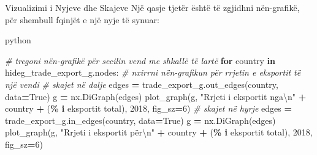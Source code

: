 \documentclass[
  ignorenonframetext,
]{beamer}
\newenvironment{Shaded}{\begin{snugshade}}{\end{snugshade}}
\newcommand{\CharTok}[1]{\textcolor[rgb]{0.31,0.60,0.02}{#1}}
\newcommand{\CommentTok}[1]{\textcolor[rgb]{0.56,0.35,0.01}{\textit{#1}}}
\newcommand{\ControlFlowTok}[1]{\textcolor[rgb]{0.13,0.29,0.53}{\textbf{#1}}}
\newcommand{\DecValTok}[1]{\textcolor[rgb]{0.00,0.00,0.81}{#1}}
\newcommand{\KeywordTok}[1]{\textcolor[rgb]{0.13,0.29,0.53}{\textbf{#1}}}
\newcommand{\NormalTok}[1]{#1}
\newcommand{\OperatorTok}[1]{\textcolor[rgb]{0.81,0.36,0.00}{\textbf{#1}}}
\newcommand{\SpecialCharTok}[1]{\textcolor[rgb]{0.81,0.36,0.00}{\textbf{#1}}}
\newcommand{\StringTok}[1]{\textcolor[rgb]{0.31,0.60,0.02}{#1}}
\newcommand{\VariableTok}[1]{\textcolor[rgb]{0.00,0.00,0.00}{#1}}
\begin{document}
\begin{frame}[fragile]{Vizualizimi i Nyjeve dhe Skajeve}
\protect\hypertarget{vizualizimi-i-nyjeve-dhe-skajeve-9}{}
Një qasje tjetër është të zgjidhni nën-grafikë, për shembull fqinjët e
një nyje të synuar:

python

\begin{Shaded}
\begin{Highlighting}[]
\CommentTok{\# tregoni nën{-}grafikë për secilin vend me shkallë të lartë}
\ControlFlowTok{for}\NormalTok{ country }\KeywordTok{in}\NormalTok{ hideg\_trade\_export\_g.nodes:}
    \CommentTok{\# nxirrni nën{-}grafikun për rrjetin e eksportit të një vendi}
    \CommentTok{\# skajet në dalje}
\NormalTok{    edges }\OperatorTok{=}\NormalTok{ trade\_export\_g.out\_edges(country, data}\OperatorTok{=}\VariableTok{True}\NormalTok{)}
\NormalTok{    g }\OperatorTok{=}\NormalTok{ nx.DiGraph(edges)}
\NormalTok{    plot\_graph(g, }\StringTok{"Rrjeti i eksportit nga}\CharTok{\textbackslash{}n}\StringTok{"} \OperatorTok{+}\NormalTok{ country }\OperatorTok{+} \StringTok{\textquotesingle{} (}\SpecialCharTok{\% i}\StringTok{ eksportit total)\textquotesingle{}}\NormalTok{, }\StringTok{\textquotesingle{}2018\textquotesingle{}}\NormalTok{, fig\_sz}\OperatorTok{=}\DecValTok{6}\NormalTok{)}
    \CommentTok{\# skajet në hyrje}
\NormalTok{    edges }\OperatorTok{=}\NormalTok{ trade\_export\_g.in\_edges(country, data}\OperatorTok{=}\VariableTok{True}\NormalTok{)}
\NormalTok{    g }\OperatorTok{=}\NormalTok{ nx.DiGraph(edges)}
\NormalTok{    plot\_graph(g, }\StringTok{"Rrjeti i eksportit për}\CharTok{\textbackslash{}n}\StringTok{"} \OperatorTok{+}\NormalTok{ country }\OperatorTok{+} \StringTok{\textquotesingle{} (}\SpecialCharTok{\% i}\StringTok{ eksportit total)\textquotesingle{}}\NormalTok{, }\StringTok{\textquotesingle{}2018\textquotesingle{}}\NormalTok{, fig\_sz}\OperatorTok{=}\DecValTok{6}\NormalTok{)}
\end{Highlighting}
\end{Shaded}
\end{frame}
\end{document}
